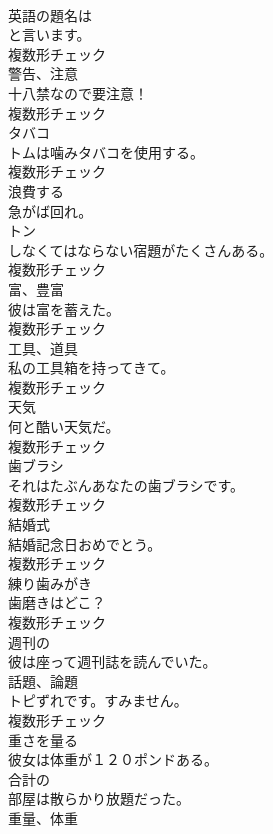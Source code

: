 \documentclass[8pt]{extreport}
\begin{document}
\begin{CJK}{UTF8}{min}
\\	英語の題名は
\\	と言います。	
\\	複数形チェック
\\	[名詞]	警告、注意	
\\	十八禁なので要注意！	
\\	複数形チェック
\\	[名詞]	タバコ	
\\	トムは噛みタバコを使用する。	
\\	複数形チェック
\\	[動詞]	浪費する	
\\	急がば回れ。	
\\	[名詞]	トン	
\\	しなくてはならない宿題がたくさんある。	
\\	複数形チェック
\\	[名詞]	富、豊富	
\\	彼は富を蓄えた。	
\\	複数形チェック
\\	[名詞]	工具、道具	
\\	私の工具箱を持ってきて。	
\\	複数形チェック
\\	[名詞]	天気	
\\	何と酷い天気だ。	
\\	複数形チェック
\\	[名詞]	⻭ブラシ	
\\	それはたぶんあなたの歯ブラシです。	
\\	複数形チェック
\\	[名詞]	結婚式	
\\	結婚記念日おめでとう。	
\\	複数形チェック
\\	[名詞]	練り⻭みがき	
\\	歯磨きはどこ？	
\\	複数形チェック
\\	[形容詞]	週刊の	
\\	彼は座って週刊誌を読んでいた。	
\\	[名詞]	話題、論題	
\\	トピずれです。すみません。	
\\	複数形チェック
\\	[動詞]	重さを量る	
\\	彼女は体重が１２０ポンドある。	
\\	[形容詞]	合計の	
\\	部屋は散らかり放題だった。	
\\	[名詞]	重量、体重	

\end{CJK}
\end{document}
